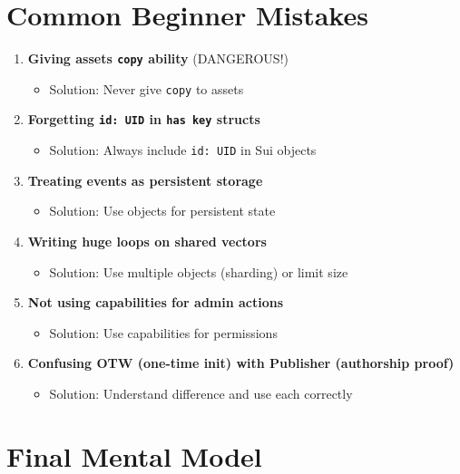 \documentclass[11pt]{article}
\begin{document}
\section{Common Beginner Mistakes}

\begin{enumerate}
  \item \textbf{Giving assets \texttt{copy} ability} (DANGEROUS!)
  \begin{itemize}
    \item Solution: Never give \texttt{copy} to assets
  \end{itemize}
  
  \item \textbf{Forgetting \texttt{id: UID} in \texttt{has key} structs}
  \begin{itemize}
    \item Solution: Always include \texttt{id: UID} in Sui objects
  \end{itemize}
  
  \item \textbf{Treating events as persistent storage}
  \begin{itemize}
    \item Solution: Use objects for persistent state
  \end{itemize}
  
  \item \textbf{Writing huge loops on shared vectors}
  \begin{itemize}
    \item Solution: Use multiple objects (sharding) or limit size
  \end{itemize}
  
  \item \textbf{Not using capabilities for admin actions}
  \begin{itemize}
    \item Solution: Use capabilities for permissions
  \end{itemize}
  
  \item \textbf{Confusing OTW (one-time init) with Publisher (authorship proof)}
  \begin{itemize}
    \item Solution: Understand difference and use each correctly
  \end{itemize}
\end{enumerate}

\section{Final Mental Model}
\end{document}
